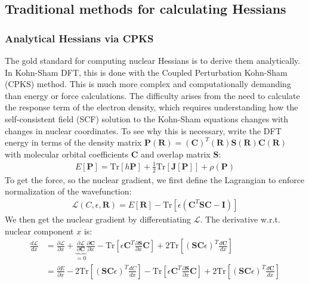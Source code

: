 \documentclass[pdflatex,sn-mathphys-num]{sn-jnl}%
\theoremstyle{thmstyleone}%
\theoremstyle{thmstyletwo}%
\theoremstyle{thmstylethree}%
\begin{document}
\begin{appendices}
\subsection{Traditional methods for calculating Hessians}
\subsubsection{Analytical Hessians via CPKS}
\label{sec:cpks}
The gold standard for computing nuclear Hessians is to derive them analytically. In Kohn-Sham DFT, this is done with the Coupled Perturbation Kohn-Sham (CPKS) method. This is much more complex and computationally demanding than energy or force calculations. The difficulty arises from the need to calculate the response term of the electron density, which requires understanding how the self-consistent field (SCF) solution to the Kohn-Sham equations changes with changes in nuclear coordinates. To see why this is necessary, write the DFT energy in terms of the density matrix $\mathbf{P}(\mathbf{R}) = (\mathbf{C})^T(\mathbf{R}) \mathbf{S}(\mathbf{R}) \mathbf{C}(\mathbf{R})$ with molecular orbital coefficients $\mathbf{C}$ and overlap matrix $\mathbf{S}$: 
\begin{align}
    E[\mathbf{P}] = \text{Tr}[h\mathbf{P}] + \frac{1}{2} \text{Tr}[\mathbf{J}[\mathbf{P}]] + \rho(\mathbf{P})
\end{align}
To get the force, so the nuclear gradient, we first define the Lagrangian to enforce normalization of the wavefunction:
\begin{align}
\mathcal{L}(C, \epsilon, \mathbf{R}) = E[\mathbf{R}] - \text{Tr}[\epsilon (\mathbf{C}^T\mathbf{S}\mathbf{C} - \mathbf{I})] \label{eq:lagrangian}
\end{align}
We then get the nuclear gradient by differentiating $\mathcal{L}$. The derivative w.r.t. nuclear component $x$ is:
\begin{align}
    \frac{d\mathcal{L}}{dx} &= \frac{\partial\mathcal{L}}{\partial x} + \underbrace{\frac{\partial \mathcal{L}}{\partial \mathbf{C}}}_{=0} \frac{\partial \mathbf{C}}{\partial x} - \text{Tr}\left[\epsilon \mathbf{C}^T \frac{\partial \mathbf{S}}{\partial x} \mathbf{C}\right] + 2 \text{Tr}\left[(\mathbf{S}\mathbf{C}\epsilon)^T\frac{d\mathbf{C}}{dx}\right] \\
    &= \frac{\partial E}{\partial x} - 2 \text{Tr}\left[(\mathbf{S}\mathbf{C}\epsilon)^T\frac{dC}{dx}\right]  -\text{Tr}\left[\epsilon \mathbf{C}^T \frac{\partial \mathbf{S}}{\partial x} \mathbf{C}\right] + 2 \text{Tr}\left[(\mathbf{S}\mathbf{C}\epsilon)^T\frac{d\mathbf{C}}{dx}\right] \\

\end{align}
\end{appendices}
\end{document}
